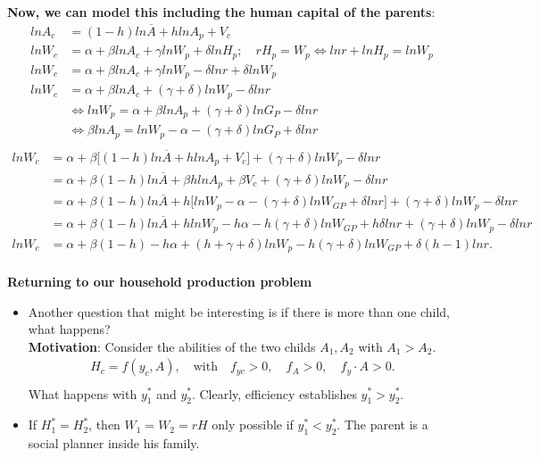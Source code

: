 \documentclass[14pt,notitlepage]{article}
\begin{document}
\textbf{Now, we can model this including the human capital of the parents}:
\begin{align*}
ln A_c &= (1-h)ln \overline{A} + h ln A_p + V_c \\
ln W_c &= \alpha + \beta ln A_c + \gamma ln W_p + \delta ln H_p; \quad r H_p = W_p \Leftrightarrow ln r + ln H_p = ln W_p \\
ln W_c &= \alpha + \beta ln A_c + \gamma ln W_p - \delta ln r + \delta ln W_p \\
ln W_c &= \alpha + \beta ln A_c + (\gamma+\delta) ln W_p - \delta ln r \\
&\Leftrightarrow ln W_p = \alpha + \beta ln A_p + (\gamma+\delta) ln G_P - \delta ln r \\
&\Leftrightarrow \beta ln A_p = ln W_p - \alpha - (\gamma+\delta) ln G_P + \delta ln r \\
\end{align*}
\begin{align*}
ln W_c &= \alpha + \beta \big[ (1-h) ln \overline{A} + h ln A_p + V_c \big] + (\gamma+\delta) ln W_p - \delta ln r \\
&= \alpha + \beta(1-h) ln \overline{A} + \beta h ln A_p + \beta V_c + (\gamma+\delta) ln W_p - \delta ln r \\
&= \alpha + \beta(1-h) ln \overline{A} + h \big[ ln W_p - \alpha - (\gamma+\delta) ln W_{GP} + \delta ln r \big] + (\gamma+\delta)lnW_p - \delta lnr \\
&= \alpha + \beta(1-h) ln \overline{A} + hln W_p - h\alpha - h(\gamma+\delta) ln W_{GP} + h\delta ln r + (\gamma+\delta)lnW_p - \delta lnr \\
ln W_c &= \alpha + \beta(1-h) - h\alpha + (h+\gamma+\delta)ln W_p - h(\gamma+\delta) ln W_{GP} + \delta(h-1) ln r. \\
\end{align*}

\textbf{Returning to our household production problem}

\begin{itemize}
\item Another question that might be interesting is if there is more than one child, what happens? \\
\textbf{Motivation}: Consider the abilities of the two childs $A_1, A_2$ with $A_1 > A_2$.
\begin{align*}
H_c = f(y_c, A), \quad \text{with} \quad f_{yc} > 0, \quad f_A > 0, \quad f_{y} \cdot A > 0. \\
\end{align*}
What happens with $y^*_1$ and $y^*_2$. Clearly, efficiency establishes $y^*_1 > y^*_2$.
\item If $H^*_1 = H^*_2$, then $W_1 = W_2 = r H$ only possible if $y^*_1 < y^*_2$. The parent is a social planner inside his family.
\end{itemize}
\end{document}
